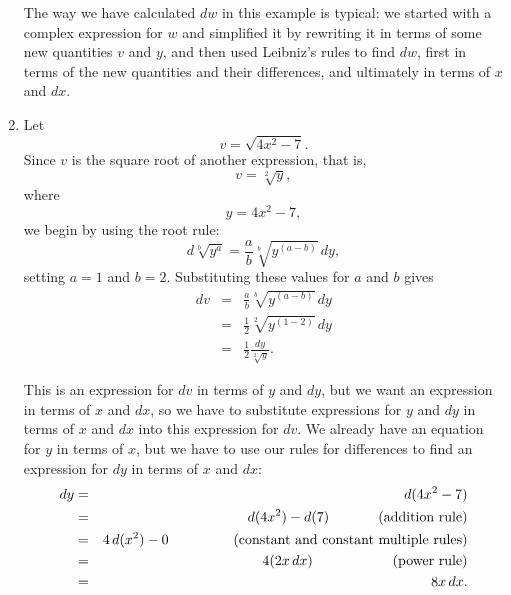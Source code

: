 \documentclass[polutonikogreek,english,twoside,openright]{article}
\newlength{\oldjot}
\begin{document}
\begin{enumerate}
The way we have calculated $dw$ in this example is typical: we started
with a complex expression for $w$ and simplified it by rewriting it in
terms of some new quantities $v$ and $y$, and then used Leibniz's
rules to find $dw$, first in terms of the new quantities and their
differences, and ultimately in terms of $x$ and $dx$. 

\item \label{ex4} Let $$v = \sqrt{4x^2 - 7}.$$
Since $v$ is the square root of another expression, that is,
$$v = \sqrt[2]{y},$$
where 
$$y = 4x^2 - 7,$$
we begin by using the root rule:
$$d\sqrt[b]{y^a} = \frac{a}{b}\sqrt[b]{y^{(a-b)}}\,dy,$$
setting $a= 1$ and $b= 2$.  Substituting these values for $a$ and $b$ gives
\setlength{\jot}{2ex}
\begin{eqnarray*}
dv & = & \frac{a}{b}\sqrt[b]{y^{(a-b)}}\,dy \\
  & = & \frac{1}{2}\sqrt[2]{y^{(1-2)}}\,dy \\
      & = & \frac{1}{2}\frac{dy}{\sqrt[2]{y}}. 
\end{eqnarray*}
\setlength{\jot}{\oldjot}

This is an expression for $dv$ in terms of $y$ and $dy$, but we want
an expression in terms of $x$ and $dx$, so we have to substitute
expressions for $y$ and $dy$ in terms of $x$ and $dx$ into this
expression for $dv$.  We already have an equation for $y$ in terms of
$x$, but we have to use our rules for differences to find an
expression for $dy$ in terms of $x$ and $dx$:
\begin{eqnarray*}
dy & = & d(4x^2 -7)\\
 & = & d(4x^2) - d(7) \mbox{\hspace{7.4ex} (addition rule)}\\
 & = & 4\,d(x^2) - 0 \mbox{\hspace{10ex} (constant and constant multiple rules)}\\
 & = & 4(2x\,dx) \mbox{\hspace{12.5ex} (power rule)}\\
 & = & 8x\,dx.
 \end{eqnarray*}



\end{enumerate}
\end{document}
